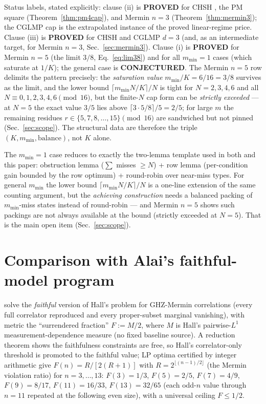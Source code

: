 \documentclass[aps,pra,reprint,superscriptaddress,floatfix]{revtex4-2}
\begin{document}
Status labels, stated explicitly: clause (ii) is \textbf{PROVED} for
{CHSH} \cite{mainpaper2026}, the PM square (Theorem~\ref{thm:pm4cap}), and
{Mermin} $n=3$ (Theorem~\ref{thm:mermin3}); the {CGLMP} cap is the
extrapolated instance of the proved linear-regime price. Clause (iii) is
\textbf{PROVED} for {CHSH} and {CGLMP} $d=3$ (and, as an intermediate
target, for {Mermin} $n=3$, Sec.~\ref{sec:mermin3}). Clause (i) is
\textbf{PROVED} for {Mermin} $n=5$ (the limit $3/8$,
Eq.~\eqref{eq:lim38}) and for all $m_{\min}=1$ cases (which saturate at
$1/K$); the general case is \textbf{CONJECTURED}. The {Mermin} $n=5$ row
delimits the pattern precisely: the \emph{saturation value}
$m_{\min}/K=6/16=3/8$ survives as the limit, and the lower bound
$\lceil m_{\min}N/K\rceil/N$ is tight for $N=2,3,4,6$ and all
$N\equiv 0,1,2,3,4,6\pmod{16}$, but the finite-$N$ cap form can be
\emph{strictly exceeded} --- at $N=5$ the exact value $3/5$ lies above
$\lceil 3\cdot 5/8\rceil/5=2/5$; for large $m$ the remaining residues
$r\in\{5,7,8,\dots,15\}\pmod{16}$ are sandwiched but not pinned
(Sec.~\ref{sec:scope}). The structural data are therefore the triple
$(K,m_{\min},\text{balance})$, not $K$ alone.

The $m_{\min}=1$ case reduces to exactly the two-lemma template used in
both \cite{mainpaper2026} and this paper: obstruction lemma
($\sum$ misses $\ge N$) + row lemma (per-condition gain bounded by the row
optimum) + round-robin over near-miss types. For general $m_{\min}$ the
lower bound $\lceil m_{\min}N/K\rceil/N$ is a one-line extension of the
same counting argument, but the \emph{achieving construction} needs a
balanced packing of $m_{\min}$-miss states instead of round-robin --- and
{Mermin} $n=5$ shows such packings are not always available at the bound
(strictly exceeded at $N=5$). That is the main open item
(Sec.~\ref{sec:scope}).

\section{Comparison with Alai's faithful-model program}
\label{sec:alai}

\citet{alai2026b} solve the \emph{faithful} version of Hall's problem for
GHZ-{Mermin} correlations (every full correlator reproduced and every
proper-subset marginal vanishing), with metric the ``surrendered fraction''
$F:=M/2$, where $M$ is Hall's pairwise-$L^{1}$ measurement-dependence
measure (no fixed baseline source). A reduction theorem shows the
faithfulness constraints are free, so Hall's correlator-only threshold is
promoted to the faithful value; LP optima certified by integer arithmetic
give $F(n)=R/[2(R+1)]$ with $R=2^{\lfloor(n-1)/2\rfloor}$ (the {Mermin}
violation ratio) for $n=3,\dots,13$: $F(3)=1/3$, $F(5)=2/5$, $F(7)=4/9$,
$F(9)=8/17$, $F(11)=16/33$, $F(13)=32/65$ (each odd-$n$ value through $n=11$ repeated at
the following even size), with a universal ceiling $F\le 1/2$.
\end{document}
